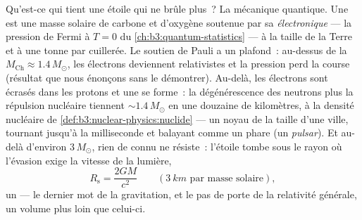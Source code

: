 \begin{proposition}\label{prop:b3:astrophysics:compact}
Qu'est-ce qui tient une étoile qui ne brûle plus~? La mécanique
quantique. Une \emph{} est une masse solaire de carbone
et d'oxygène soutenue par sa \emph{
électronique} --- la pression de Fermi à $T = 0$ du
\cref{ch:b3:quantum-statistics} --- à la taille de la Terre et à une
tonne par cuillerée. Le soutien de Pauli a un plafond~: au-dessus de
la \emph{} $M_{\text{Ch}}
\approx 1.4\,M_\odot$, les électrons deviennent relativistes et la
pression perd la course (résultat que nous énonçons sans le
démontrer). Au-delà, les électrons sont écrasés dans les protons et
une \emph{} se forme~: la dégénérescence des
neutrons plus la répulsion nucléaire tiennent
$\sim1.4\,M_\odot$ en une douzaine de kilomètres, à la densité
nucléaire de \cref{def:b3:nuclear-physics:nuclide} --- un noyau de la
taille d'une ville, tournant jusqu'à la milliseconde et balayant
comme un phare (un \emph{pulsar}). Et au-delà d'environ
$3\,M_\odot$, rien de connu ne résiste~: l'étoile tombe sous le rayon
où l'évasion exige la vitesse de la lumière,
\[
R_{\text{s}} = \frac{2GM}{c^2}
\qquad (\qty{3}{km}\text{ par masse solaire}) ,
\]
un \emph{} --- le dernier mot de la gravitation, et le pas
de porte de la relativité générale, un volume plus loin que celui-ci.
\end{proposition}
\admitted

